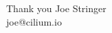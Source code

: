 \documentclass[black,white]{beamer}
\begin{document}
    \section{}
    \begin{frame}{Thank you}
        \vfill
	\centering
	Joe Stringer \\\medskip
	joe@cilium.io
	\vfill
    \end{frame}

\end{document}
